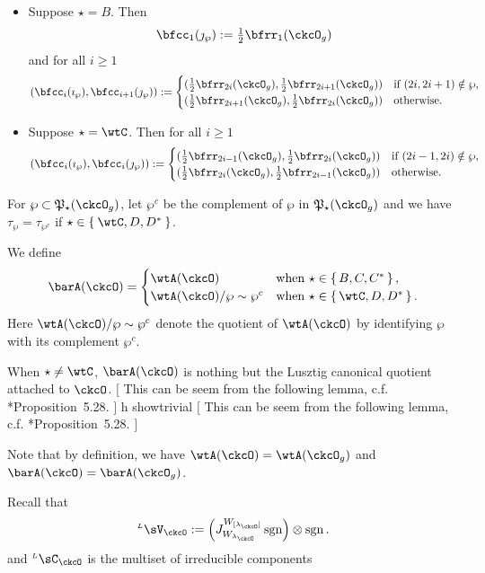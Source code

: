 \documentclass[12pt,a4paper]{amsart}
\newcommand{\trivial}[2][]{\if\relax\detokenize{#1}\relax
  {%
      \color{orange} \vspace{0em} $[$  #2 $]$
      \color{black}
  }
  \else
\ifx#1h
\ifcsname showtrivial\endcsname
{%
    \color{orange} \vspace{0em}  $[$ #2 $]$
    \color{black}
}
\fi
\else {\red Wrong argument!} \fi
\fi
}
\newcommand{\sgn}{\operatorname{sgn}}
\numberwithin{equation}{section}
\theoremstyle{remark}
\def\half{{\tfrac{1}{2}}}
\def\lamck{\lambda_\ckcO}
\def\WLamck{W_{[\lambda_{\ckcO}]}}
\def\Wlamck{W_{\lamck}}
\def\LC{{}^{\scriptscriptstyle L}\sC}
\def\LV{{}^{\scriptscriptstyle L}\sV}
\def\CPPs{\mathfrak{P}_{\star}}
\def\imathp{\imath_{\sP}}
\def\jmathp{\jmath_{\sP}}
\def\sP{\wp}
\begin{document}
\begin{itemize}
    \item Suppose $\star=B$.
    Then
    \[
      \bfcc_{1}(\jmathp)  := \half\bfrr_{1}(\ckcO_{g})
    \]
    and for all $i\geq 1$
    \[
      (\bfcc_{i}(\imathp), \bfcc_{i+1}(\jmathp)):=
      \begin{cases}
        (\half \bfrr_{2i}(\ckcO_{g}), \half \bfrr_{2i+1}(\ckcO_{g}))
        & \text{if } (2i,2i+1)\notin \sP,\\
        (\half \bfrr_{2i+1}(\ckcO_{g}),\half \bfrr_{2i}(\ckcO_{g})) & \text{otherwise.}
      \end{cases}
    \]
    \item Suppose $\star = \wtC$.
    Then for all  $i\geq 1$
    \[
      (\bfcc_{i}(\imathp), \bfcc_{i}(\jmathp)):=
      \begin{cases}
        (\half \bfrr_{2i-1}(\ckcO_{g}), \half \bfrr_{2i}(\ckcO_{g}))
        & \text{if } (2i-1,2i)\notin \sP,\\
        (\half \bfrr_{2i}(\ckcO_{g}),\half \bfrr_{2i-1}(\ckcO_{g})) & \text{otherwise.}
      \end{cases}
    \]
  \end{itemize}

  For $\sP\subset\CPPs(\ckcO_{g})$, let $\sP^{c}$ be the complement of $\sP$ in
  $\CPPs(\ckcO_{g})$ and we have $\tau_{\sP} = \tau_{\sP^{c}}$ if
  $\star \in \Set{\wtC,D,D^{*}}$.

  We define
  \[
    \barA(\ckcO)=
    \begin{cases}
      \wtA(\ckcO) & \text{when } \star \in \set{B,C,C^{*}},\\
      \wtA(\ckcO)/\wp\sim\wp^{c} & \text{when } \star \in \set{\wtC,D,D^{*}}.\\
    \end{cases}
  \]
  Here $\wtA(\ckcO)/\sP\sim\sP^{c}$ denote the quotient of $\wtA(\ckcO)$ by
  identifying $\sP$ with its complement $\sP^{c}$.

  When $\star\neq \wtC$, $\barA(\ckcO)$ is nothing but the Lusztig canonical
  quotient attached to $\ckcO$.
  \trivial{
    This can be seem from the following lemma, c.f.
    \cite{BVUni}*{Proposition~5.28}.
  }

  Note that by definition, we have
  $\wtA(\ckcO)=\wtA(\ckcO_{g})$ and
  $\barA(\ckcO)=\barA(\ckcO_{g})$.

  Recall that
  \[
    \LV_{\ckcO}:= \left(J_{\Wlamck}^{\WLamck} \sgn\right)
    \otimes \sgn.
  \]
  and $\LC_{\ckcO}$ is the multiset of irreducible components
\end{document}

